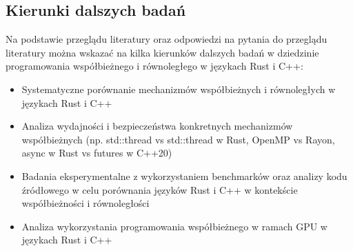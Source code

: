 \subsection{Kierunki dalszych badań}
Na podstawie przeglądu literatury oraz odpowiedzi na pytania do przeglądu literatury można wskazać na kilka kierunków dalszych badań w dziedzinie programowania współbieżnego i równoległego w językach Rust i C++:
\begin{itemize}
    \item Systematyczne porównanie mechanizmów współbieżnych i równoległych w językach Rust i C++
    \item Analiza wydajności i bezpieczeństwa konkretnych mechanizmów współbieżnych (np. std::thread vs std::thread w Rust, OpenMP vs Rayon, async w Rust vs futures w C++20)
    \item Badania eksperymentalne z wykorzystaniem benchmarków oraz analizy kodu źródłowego w celu porównania języków Rust i C++ w kontekście współbieżności i równoległości
    \item Analiza wykorzystania programowania współbieżnego w ramach GPU w językach Rust i C++
\end{itemize}
